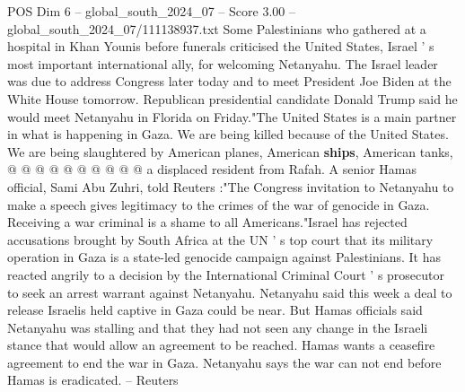 \begin{textsample}{POS Dim 6 – global\_south\_2024\_07 – Score 3.00 – global\_south\_2024\_07/111138937.txt}
Some Palestinians who gathered at a hospital in Khan Younis before funerals criticised the United States, Israel ' s most important international ally, for welcoming Netanyahu.
The Israel leader was due to address Congress later today and to meet President Joe Biden at the White House tomorrow.
Republican presidential candidate Donald Trump said he would meet Netanyahu in Florida on Friday."The United States is a main partner in what is happening in Gaza.
We are being killed because of the United States.
We are being slaughtered by American planes, American \textbf{ships}, American tanks, @ @ @ @ @ @ @ @ @ @ a displaced resident from Rafah.
A senior Hamas official, Sami Abu Zuhri, told Reuters :"The Congress invitation to Netanyahu to make a speech gives legitimacy to the crimes of the war of genocide in Gaza.
Receiving a war criminal is a shame to all Americans."Israel has rejected accusations brought by South Africa at the UN ' s top court that its military operation in Gaza is a state-led genocide campaign against Palestinians.
It has reacted angrily to a decision by the International Criminal Court ' s prosecutor to seek an arrest warrant against Netanyahu.
Netanyahu said this week a deal to release Israelis held captive in Gaza could be near.
But Hamas officials said Netanyahu was stalling and that they had not seen any change in the Israeli stance that would allow an agreement to be reached.
Hamas wants a ceasefire agreement to end the war in Gaza.
Netanyahu says the war can not end before Hamas is eradicated. -- Reuters

\end{textsample}
